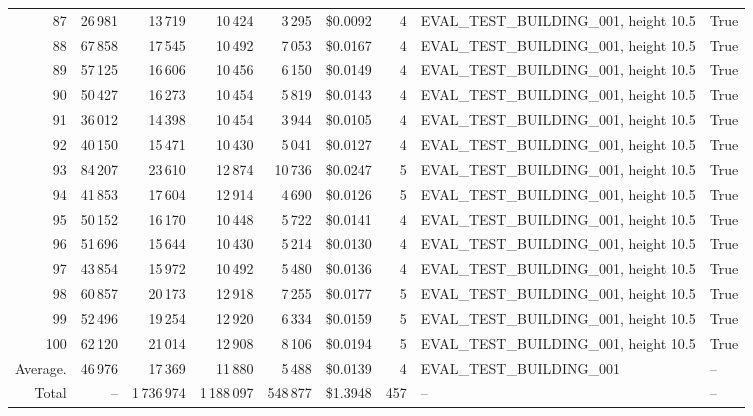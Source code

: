 \documentclass[a4paper,11pt]{article}
\begin{document}
\begin{table}[ht]
\begin{tabular}{r r r r r r r p{3cm} l}
87 & 26\,981 & 13\,719 & 10\,424 & 3\,295 & \$0.0092 & 4 & EVAL\_TEST\_BUILDING\_001, height 10.5 & True \\
88 & 67\,858 & 17\,545 & 10\,492 & 7\,053 & \$0.0167 & 4 & EVAL\_TEST\_BUILDING\_001, height 10.5 & True \\
89 & 57\,125 & 16\,606 & 10\,456 & 6\,150 & \$0.0149 & 4 & EVAL\_TEST\_BUILDING\_001, height 10.5 & True \\
90 & 50\,427 & 16\,273 & 10\,454 & 5\,819 & \$0.0143 & 4 & EVAL\_TEST\_BUILDING\_001, height 10.5 & True \\
91 & 36\,012 & 14\,398 & 10\,454 & 3\,944 & \$0.0105 & 4 & EVAL\_TEST\_BUILDING\_001, height 10.5 & True \\
92 & 40\,150 & 15\,471 & 10\,430 & 5\,041 & \$0.0127 & 4 & EVAL\_TEST\_BUILDING\_001, height 10.5 & True \\
93 & 84\,207 & 23\,610 & 12\,874 & 10\,736 & \$0.0247 & 5 & EVAL\_TEST\_BUILDING\_001, height 10.5 & True \\
94 & 41\,853 & 17\,604 & 12\,914 & 4\,690 & \$0.0126 & 5 & EVAL\_TEST\_BUILDING\_001, height 10.5 & True \\
95 & 50\,152 & 16\,170 & 10\,448 & 5\,722 & \$0.0141 & 4 & EVAL\_TEST\_BUILDING\_001, height 10.5 & True \\
96 & 51\,696 & 15\,644 & 10\,430 & 5\,214 & \$0.0130 & 4 & EVAL\_TEST\_BUILDING\_001, height 10.5 & True \\
97 & 43\,854 & 15\,972 & 10\,492 & 5\,480 & \$0.0136 & 4 & EVAL\_TEST\_BUILDING\_001, height 10.5 & True \\
98 & 60\,857 & 20\,173 & 12\,918 & 7\,255 & \$0.0177 & 5 & EVAL\_TEST\_BUILDING\_001, height 10.5 & True \\
99 & 52\,496 & 19\,254 & 12\,920 & 6\,334 & \$0.0159 & 5 & EVAL\_TEST\_BUILDING\_001, height 10.5 & True \\
100 & 62\,120 & 21\,014 & 12\,908 & 8\,106 & \$0.0194 & 5 & EVAL\_TEST\_BUILDING\_001, height 10.5 & True \\
\hline
Average. & 46\,976 & 17\,369 & 11\,880 & 5\,488 & \$0.0139 & 4 & EVAL\_TEST\_BUILDING\_001 & -- \\
Total & -- & 1\,736\,974 & 1\,188\,097 & 548\,877 & \$1.3948 & 457 & -- & -- \\
\hline
\end{tabular}
\end{table}

\clearpage
\end{document}
